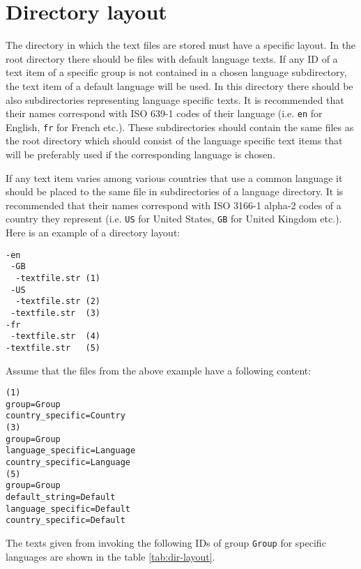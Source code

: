 \section{Directory layout}
\label{sec:dir-layout}

The directory in which the text files are stored must have a specific layout. In the root directory there should be files with default language texts. If any ID of a text item of a specific group is not contained in a chosen language subdirectory, the text item of a default language will be used. In this directory there should be also subdirectories representing language specific texts. It is recommended that their names correspond with ISO 639-1 codes \cite{ISO-639-1} of their language (i.e. \verb/en/ for English, \verb/fr/ for French etc.). These subdirectories should contain the same files as the root directory which should consist of the language specific text items that will be preferably used if the corresponding language is chosen.

If any text item varies among various countries that use a common language it should be placed to the same file in subdirectories of a language directory. It is recommended that their names correspond with ISO 3166-1 alpha-2 codes \cite{ISO-3166-1} of a country they represent (i.e. \verb/US/ for United States, \verb/GB/ for United Kingdom etc.). Here is an example of a directory layout:

\begin{verbatim}
-en
 -GB
  -textfile.str (1)
 -US
  -textfile.str (2)
 -textfile.str  (3)
-fr
 -textfile.str  (4)
-textfile.str   (5)
\end{verbatim}

Assume that the files from the above example have a following content:

\begin{verbatim}
(1)
group=Group
country_specific=Country
(3)
group=Group
language_specific=Language
country_specific=Language
(5)
group=Group
default_string=Default
language_specific=Default
country_specific=Default
\end{verbatim}

The texts given from invoking the following IDs of group \verb/Group/ for specific languages are shown in the table \ref{tab:dir-layout}.

